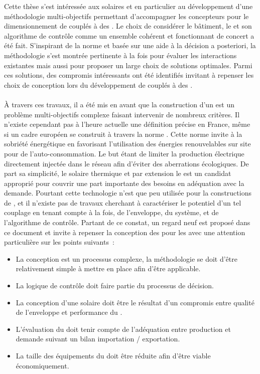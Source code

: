 
Cette thèse s’est intéressée aux  solaires et en particulier au développement
d’une méthodologie  multi-objectifs permettant d’accompagner les concepteurs pour le
dimensionnement de  couplés à des . Le choix de
considérer le bâtiment, le  et son algorithme de contrôle comme un ensemble
cohérent et fonctionnant de concert a été fait. S’inspirant de la norme  et
basée sur une aide à la décision a posteriori, la méthodologie s’est montrée pertinente
à la fois pour évaluer les interactions existantes mais aussi pour proposer un large choix
de solutions optimales. Parmi ces solutions, des compromis intéressants ont été
identifiés invitant à repenser les choix de conception lors du développement de 
couplés à des .


\paragraph{} %
À travers ces travaux, il a été mis en avant que la construction d’un  est un
problème multi-objectifs complexe faisant intervenir de nombreux critères. Il n’existe
cependant pas à l’heure actuelle une définition précise en France, même si un cadre
européen se construit à travers la norme . Cette norme invite à
la sobriété énergétique en favorisant l’utilisation des énergies renouvelables sur site
pour de l’auto-consommation. Le but étant de limiter la production électrique directement
injectée dans le réseau afin d’éviter des aberrations écologiques.
De part sa simplicité, le solaire thermique et par extension le  est un
candidat approprié pour couvrir une part importante des besoins en adéquation avec la
demande. Pourtant cette technologie n’est que peu utilisée pour la constructions de
, et il n’existe pas de travaux cherchant à caractériser le potentiel d’un tel
couplage en tenant compte à la fois, de l’enveloppe, du système, et de l’algorithme de
contrôle. Partant de ce constat, un regard neuf est proposé dans ce document et invite à
repenser la conception des  pour les  avec une attention
particulière sur les points suivants~:
\begin{itemize}
    \item La conception est un processus complexe, la méthodologie se doit d’être
          relativement simple à mettre en place afin d’être applicable.
    \item La logique de contrôle doit faire partie du processus de décision.
    \item La conception d’une  solaire doit être le résultat d’un compromis
          entre qualité de l’enveloppe et performance du .
    \item L’évaluation du  doit tenir compte de l’adéquation entre production
          et demande suivant un bilan importation / exportation.
    \item La taille des équipements du  doit être réduite afin d’être viable
          économiquement.
\end{itemize}

